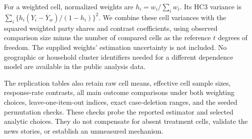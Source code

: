 \documentclass[11pt]{article}
\begin{document}
For a weighted cell, normalized weights are $h_i=w_i/\sum_iw_i$. Its HC3 variance is $\sum_i\{h_i(Y_i-\overline Y_w)/(1-h_i)\}^2$. We combine these cell variances with the squared weighted party shares and contrast coefficients, using observed comparison size minus the number of compared cells as the reference $t$ degrees of freedom. The supplied weights' estimation uncertainty is not included. No geographic or household cluster identifiers needed for a different dependence model are available in the public analysis data.

The replication tables also retain raw cell means, effective cell sample sizes, response-rate contrasts, all main outcome comparisons under both weighting choices, leave-one-item-out indices, exact case-deletion ranges, and the seeded permutation checks. These checks probe the reported estimator and selected analytic choices. They do not compensate for absent treatment cells, validate the news stories, or establish an unmeasured mechanism.
\end{document}
